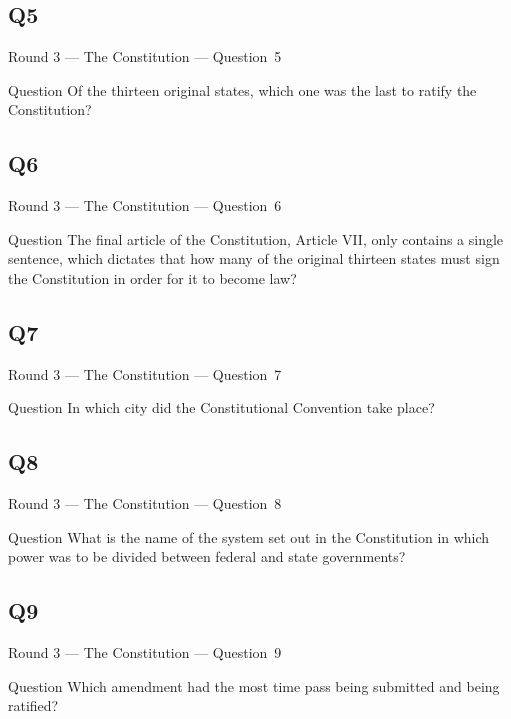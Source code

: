\documentclass[11pt]{beamer}
\begin{document}
\subsection*{Q5}
\begin{frame}[t]{Round 3 --- The Constitution --- \mbox{Question 5}}
\vspace{-0.5em}
\begin{block}{Question}
Of the thirteen original states, which one was the last to ratify the Constitution?
\end{block}
\end{frame}
\subsection*{Q6}
\begin{frame}[t]{Round 3 --- The Constitution --- \mbox{Question 6}}
\vspace{-0.5em}
\begin{block}{Question}
The final article of the Constitution, Article VII, only contains a single sentence, which dictates that how many of the original thirteen states must sign the Constitution in order for it to become law?
\end{block}
\end{frame}
\subsection*{Q7}
\begin{frame}[t]{Round 3 --- The Constitution --- \mbox{Question 7}}
\vspace{-0.5em}
\begin{block}{Question}
In which city did the Constitutional Convention take place?
\end{block}
\end{frame}
\subsection*{Q8}
\begin{frame}[t]{Round 3 --- The Constitution --- \mbox{Question 8}}
\vspace{-0.5em}
\begin{block}{Question}
What is the name of the system set out in the Constitution in which power was to be divided between federal and state governments?
\end{block}
\end{frame}
\subsection*{Q9}
\begin{frame}[t]{Round 3 --- The Constitution --- \mbox{Question 9}}
\vspace{-0.5em}
\begin{block}{Question}
Which amendment had the most time pass being submitted and being ratified?
\end{block}
\end{frame}
\end{document}
